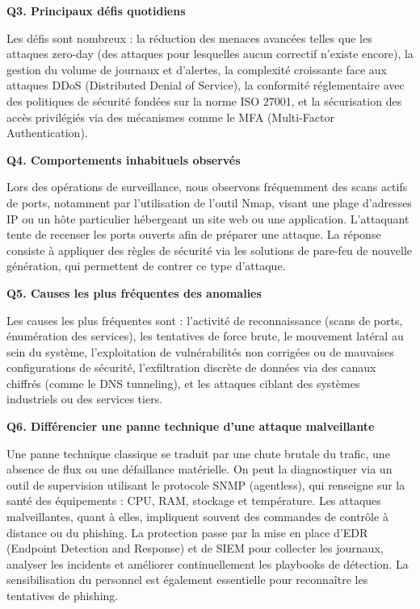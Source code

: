 \documentclass[12pt,a4paper]{article}
\begin{document}
\bigskip
\textbf{Q3. Principaux d\'{e}fis quotidiens}

Les d\'{e}fis sont nombreux : la r\'{e}duction des menaces avanc\'{e}es telles que les attaques
zero-day (des attaques pour lesquelles aucun correctif n'existe encore), la gestion du volume
de journaux et d'alertes, la complexit\'{e} croissante face aux attaques DDoS (Distributed Denial
of Service), la conformit\'{e} r\'{e}glementaire avec des politiques de s\'{e}curit\'{e} fond\'{e}es sur la norme
ISO 27001, et la s\'{e}curisation des acc\`{e}s privil\'{e}gi\'{e}s via des m\'{e}canismes comme le MFA
(Multi-Factor Authentication).

\bigskip
\textbf{Q4. Comportements inhabituels observ\'{e}s}

Lors des op\'{e}rations de surveillance, nous observons fr\'{e}quemment des scans actifs de ports,
notamment par l'utilisation de l'outil Nmap, visant une plage d'adresses IP ou un h\^{o}te particulier
h\'{e}bergeant un site web ou une application. L'attaquant tente de recenser les ports ouverts afin
de pr\'{e}parer une attaque. La r\'{e}ponse consiste \`{a} appliquer des r\`{e}gles de s\'{e}curit\'{e} via les
solutions de pare-feu de nouvelle g\'{e}n\'{e}ration, qui permettent de contrer ce type d'attaque.

\bigskip
\textbf{Q5. Causes les plus fr\'{e}quentes des anomalies}

Les causes les plus fr\'{e}quentes sont : l'activit\'{e} de reconnaissance (scans de ports,
\'{e}num\'{e}ration des services), les tentatives de force brute, le mouvement lat\'{e}ral au sein du
syst\`{e}me, l'exploitation de vuln\'{e}rabilit\'{e}s non corrig\'{e}es ou de mauvaises configurations de
s\'{e}curit\'{e}, l'exfiltration discr\`{e}te de donn\'{e}es via des canaux chiffr\'{e}s (comme le DNS tunneling),
et les attaques ciblant des syst\`{e}mes industriels ou des services tiers.

\bigskip
\textbf{Q6. Diff\'{e}rencier une panne technique d'une attaque malveillante}

Une panne technique classique se traduit par une chute brutale du trafic, une absence de flux
ou une d\'{e}faillance mat\'{e}rielle. On peut la diagnostiquer via un outil de supervision utilisant le
protocole SNMP (agentless), qui renseigne sur la sant\'{e} des \'{e}quipements : CPU, RAM, stockage
et temp\'{e}rature. Les attaques malveillantes, quant \`{a} elles, impliquent souvent des commandes
de contr\^{o}le \`{a} distance ou du phishing. La protection passe par la mise en place d'EDR
(Endpoint Detection and Response) et de SIEM pour collecter les journaux, analyser les
incidents et am\'{e}liorer continuellement les playbooks de d\'{e}tection. La sensibilisation du
personnel est \'{e}galement essentielle pour reconna\^{i}tre les tentatives de phishing.
\end{document}

